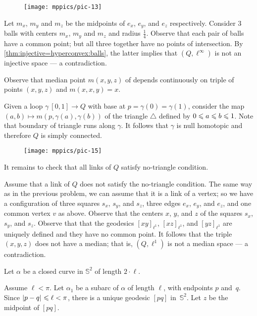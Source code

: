 \begin{wrapfigure}{r}{25 mm}
\vskip-4mm
\centering
\texttt{[image: mppics/pic-13]}
\end{wrapfigure}

Let $m_x$, $m_y$ and $m_z$ be the midpoints of $e_x$, $e_y$, and $e_z$ respectively.
Consider 3 balls with centers $m_x$, $m_y$ and $m_z$ and radius $\tfrac14$.
Observe that each pair of balls have a common point;
but all three together have no points of intersection.
By \ref{thm:injective=hyperconvex:balls}, the latter implies that $(Q,\ell^\infty)$ is not an injective space --- a contradiction.


Observe that median point $m(x,y,z)$ of depends continuously on triple of points $(x,y,z)$ and $m(x,x,y)=x$.

Given a loop $\gamma\:[0,1]\to Q$ with base at $p=\gamma(0)=\gamma(1)$,
consider the map $(a,b)\mapsto m(p,\gamma(a),\gamma(b))$ of the triangle $\triangle$ defined by $0\z\le a \z\le b\z\le 1$.
Note that boundary of triangle runs along $\gamma$.
It follows that $\gamma$ is null homotopic and therefore $Q$ is simply connected.

\begin{wrapfigure}{r}{25 mm}
\vskip-4mm
\centering
\texttt{[image: mppics/pic-15]}
\end{wrapfigure}

It remains to check that all links of $Q$ satisfy no-triangle condition.

Assume that a link of $Q$ does not satisfy the no-triangle condition.
The same way as in the previous problem, we can assume that it is a link of a vertex;
so we have a configuration of three squares $s_x$, $s_y$, and $s_z$, 
three edges $e_x$, $e_y$, and $e_z$, and one common vertex $v$ as above.
Observe that the centers $x$, $y$, and $z$ of the squares $s_x$, $s_y$, and $s_z$.
Observe that that the geodesics $[xy]_{\ell^1}$, $[xz]_{\ell^1}$, and $[yz]_{\ell^1}$ are uniquely defined and they have no common point.
It follows that the triple $(x,y,z)$ does not have a median; 
that is, $(Q,\ell^1)$ is not a median space --- a contradiction.


Let $\alpha$ be a closed curve in $\mathbb{S}^2$ of length $2\cdot\ell$.

Assume $\ell<\pi$.
Let $\alpha_1$ be a subarc of $\alpha$ of length $\ell$, with endpoints $p$ and~$q$. 
Since $\dist{p}{q}{}\le\ell<\pi$, there is a unique geodesic $[pq]$ in~$\mathbb{S}^2$.  
Let $z$ be the midpoint of $[pq]$. 

